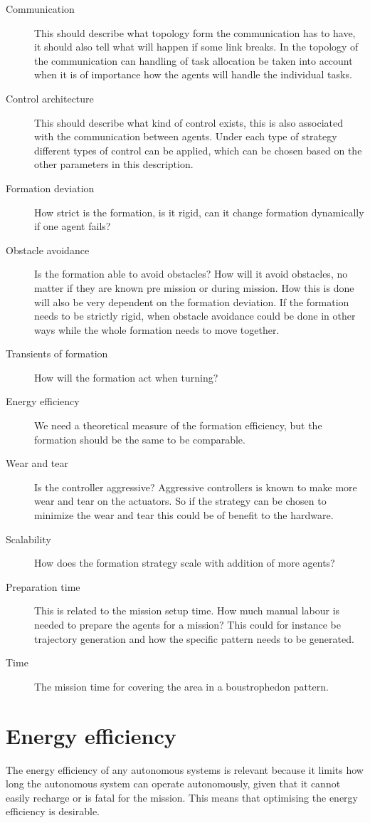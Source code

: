 \begin{description}
\item[Communication] This should describe what topology form the communication has to have, it should also tell what will happen if some link breaks. In the topology of the communication can handling of task allocation be taken into account when it is of importance how the agents will handle the individual tasks.
\item[Control architecture] This should describe what kind of control exists, this is also associated with the communication between agents. Under each type of strategy different types of control can be applied, which can be chosen based on the other parameters in this description.
\item[Formation deviation] How strict is the formation, is it rigid, can it change formation dynamically if one agent fails?
\item[Obstacle avoidance] Is the formation able to avoid obstacles? How will it avoid obstacles, no matter if they are known pre mission or during mission. How this is done will also be very dependent on the formation deviation. If the formation needs to be strictly rigid, when obstacle avoidance could be done in other ways while the whole formation needs to move together.
\item[Transients of formation] How will the formation act when turning?
\item[Energy efficiency] We need a theoretical measure of the formation efficiency, but the formation should be the same to be comparable.
\item[Wear and tear] Is the controller aggressive? Aggressive controllers is known to make more wear and tear on the actuators. So if the strategy can be chosen to minimize the wear and tear this could be of benefit to the hardware.
\item[Scalability] How does the formation strategy scale with addition of more agents?
\item[Preparation time] This is related to the mission setup time. How much manual labour is needed to prepare the agents for a mission? This could for instance be trajectory generation and how the specific pattern needs to be generated.
\item[Time] The mission time for covering the area in a boustrophedon pattern.
\end{description}

\section{Energy efficiency}
The energy efficiency of any autonomous systems is relevant because it limits how long the autonomous system can operate autonomously, given that it cannot easily recharge or is fatal for the mission. This means that optimising the energy efficiency is desirable.

